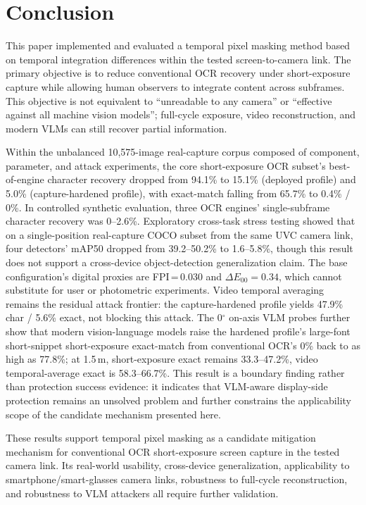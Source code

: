 \documentclass{ieeeaccess}
\begin{document}
\section{Conclusion}
\label{sec:conclusion}

This paper implemented and evaluated a temporal pixel masking method based on temporal integration differences within the tested screen-to-camera link. The primary objective is to reduce conventional OCR recovery under short-exposure capture while allowing human observers to integrate content across subframes. This objective is not equivalent to ``unreadable to any camera'' or ``effective against all machine vision models''; full-cycle exposure, video reconstruction, and modern VLMs can still recover partial information.

Within the unbalanced 10,575-image real-capture corpus composed of component, parameter, and attack experiments, the core short-exposure OCR subset's best-of-engine character recovery dropped from 94.1\% to 15.1\% (deployed profile) and 5.0\% (capture-hardened profile), with exact-match falling from 65.7\% to 0.4\% / 0\%. In controlled synthetic evaluation, three OCR engines' single-subframe character recovery was 0--2.6\%. Exploratory cross-task stress testing showed that on a single-position real-capture COCO subset from the same UVC camera link, four detectors' mAP50 dropped from 39.2--50.2\% to 1.6--5.8\%, though this result does not support a cross-device object-detection generalization claim. The base configuration's digital proxies are FPI\,=\,0.030 and $\Delta E_{00}=0.34$, which cannot substitute for user or photometric experiments. Video temporal averaging remains the residual attack frontier: the capture-hardened profile yields 47.9\% char / 5.6\% exact, not blocking this attack. The 0$^{\circ}$ on-axis VLM probes further show that modern vision-language models raise the hardened profile's large-font short-snippet short-exposure exact-match from conventional OCR's 0\% back to as high as 77.8\%; at 1.5\,m, short-exposure exact remains 33.3--47.2\%, video temporal-average exact is 58.3--66.7\%. This result is a boundary finding rather than protection success evidence: it indicates that VLM-aware display-side protection remains an unsolved problem and further constrains the applicability scope of the candidate mechanism presented here.

These results support temporal pixel masking as a candidate mitigation mechanism for conventional OCR short-exposure screen capture in the tested camera link. Its real-world usability, cross-device generalization, applicability to smartphone/smart-glasses camera links, robustness to full-cycle reconstruction, and robustness to VLM attackers all require further validation.
\end{document}
